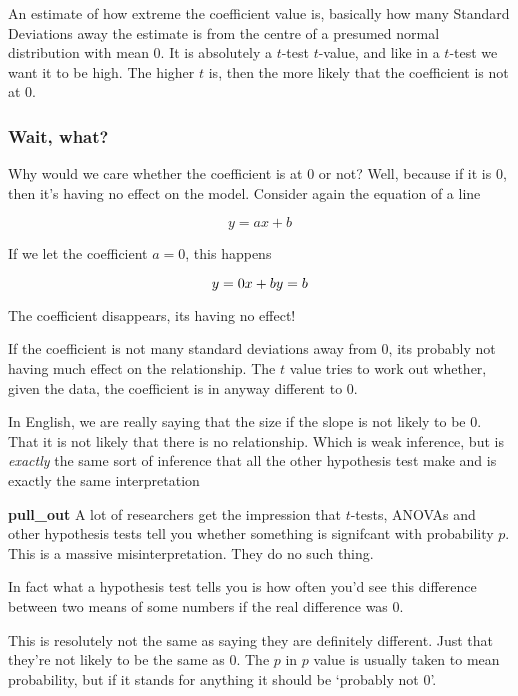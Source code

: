 \documentclass[]{book}
\begin{document}
An estimate of how extreme the coefficient value is, basically how many Standard Deviations away the estimate is from the centre of a presumed normal distribution with mean 0. It is absolutely a \(t\)-test \(t\)-value, and like in a \(t\)-test we want it to be high. The higher \(t\) is, then the more likely that the coefficient is not at 0.

\hypertarget{wait-what}{%
\subsubsection{Wait, what?}\label{wait-what}}

Why would we care whether the coefficient is at 0 or not? Well, because if it is 0, then it's having no effect on the model. Consider again the equation of a line

\begin{equation}
y = ax + b
\end{equation}

If we let the coefficient \(a = 0\), this happens

\begin{equation}
y = 0 x + b\\
y = b
\end{equation}

The coefficient disappears, its having no effect!

If the coefficient is not many standard deviations away from 0, its probably not having much effect on the relationship. The \(t\) value tries to work out whether, given the data, the coefficient is in anyway different to 0.

In English, we are really saying that the size if the slope is not likely to be 0. That it is not likely that there is no relationship. Which is weak inference, but is \emph{exactly} the same sort of inference that all the other hypothesis test make and is exactly the same interpretation

\textbf{pull\_out}
A lot of researchers get the impression that \(t\)-tests, ANOVAs and other hypothesis tests tell you whether something is signifcant with probability \(p\). This is a massive misinterpretation. They do no such thing.

In fact what a hypothesis test tells you is how often you'd see this difference between two means of some numbers if the real difference was 0.

This is resolutely not the same as saying they are definitely different. Just that they're not likely to be the same as 0. The \(p\) in \(p\) value is usually taken to mean probability, but if it stands for anything it should be `probably not 0'.
\end{document}
